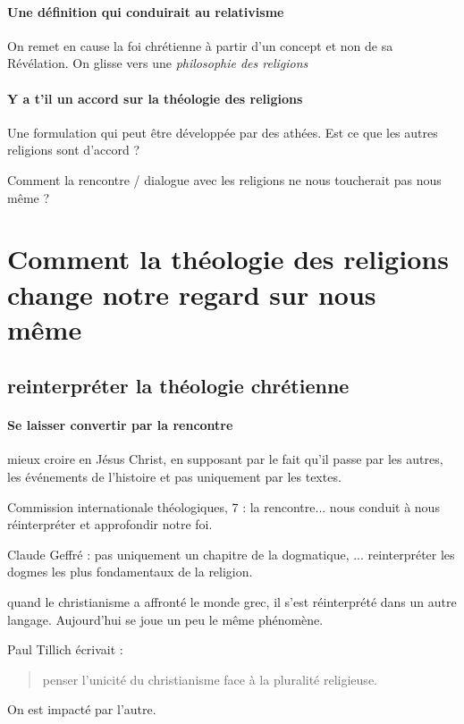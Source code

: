 \paragraph{Une définition qui conduirait au relativisme} On remet en cause la foi chrétienne à partir d'un concept et non de sa Révélation. On glisse vers une \textit{philosophie des religions}

\paragraph{Y a t'il un accord sur la théologie des religions} Une formulation qui peut être développée par des athées. Est ce que les autres religions sont d'accord ?

\begin{Synthesis}
Comment la rencontre / dialogue avec les religions ne nous toucherait pas nous même ?
\end{Synthesis}

\section{Comment la théologie des religions change notre regard sur nous même}

\subsection{reinterpréter la théologie chrétienne}

\paragraph{Se laisser convertir par la rencontre} mieux croire en Jésus Christ, en supposant par le fait qu'il passe par les autres, les événements de l'histoire et pas uniquement par les textes.

Commission internationale théologiques, 7 : la rencontre... nous conduit à nous réinterpréter et approfondir notre foi.

Claude Geffré : pas uniquement un chapitre de la dogmatique, ... reinterpréter les dogmes les plus fondamentaux de la religion.

\begin{Ex}
quand le christianisme a affronté le monde grec, il s'est réinterprété dans un autre langage. Aujourd'hui se joue un peu le même phénomène. 
\end{Ex}

Paul Tillich  écrivait : 
\begin{quote}
    penser l'unicité du christianisme face à la pluralité religieuse.
\end{quote}
On est impacté par l'autre.

